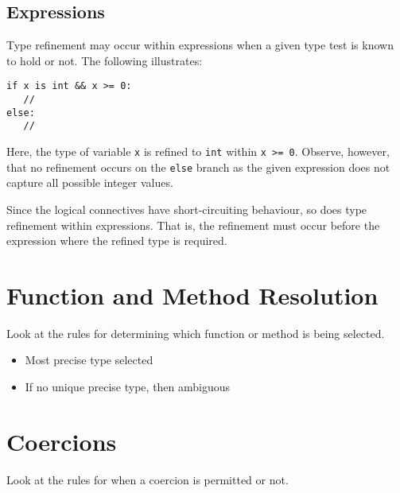 \subsection{Expressions}

Type refinement may occur within expressions when a given type test is
known to hold or not.  The following illustrates:

\begin{lstlisting}
if x is int && x >= 0:
   //
else:
   //
\end{lstlisting}

Here, the type of variable \lstinline{x} is refined to \lstinline{int}
within \lstinline{x >= 0}.  Observe, however, that no refinement
occurs on the \lstinline{else} branch as the given expression does not
capture all possible integer values.

Since the logical connectives have short-circuiting behaviour, so does
type refinement within expressions.  That is, the refinement must
occur before the expression where the refined type is required.

\section{Function and Method Resolution}
Look at the rules for determining which function or method is being selected.

\begin{itemize}
\item Most precise type selected
\item If no unique precise type, then ambiguous

\end{itemize}


\section{Coercions}
Look at the rules for when a coercion is permitted or not.
